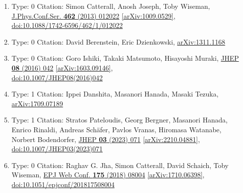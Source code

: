 \documentclass[a4paper,10pt]{article}
\begin{document}
\begin{enumerate}
\begin{enumerate}
  \item Type: 0 Citation: Simon Catterall, Anosh Joseph, Toby Wiseman, \href{https://www.doi.org/10.1088/1742-6596/462/1/012022}{J.Phys.Conf.Ser. {\bf 462} (2013) 012022}  \href{https://arxiv.org/abs/1009.0529}{[arXiv:1009.0529]},\\\href{https://www.doi.org/10.1088/1742-6596/462/1/012022}{doi:10.1088/1742-6596/462/1/012022}
  \item Type: 0 Citation: David Berenstein, Eric Dzienkowski, \href{https://arxiv.org/abs/1311.1168}{arXiv:1311.1168}
  \item Type: 0 Citation: Goro Ishiki, Takaki Matsumoto, Hisayoshi Muraki, \href{https://www.doi.org/10.1007/JHEP08(2016)042}{JHEP {\bf 08} (2016) 042}  \href{https://arxiv.org/abs/1603.09146}{[arXiv:1603.09146]},\\\href{https://www.doi.org/10.1007/JHEP08(2016)042}{doi:10.1007/JHEP08(2016)042}
  \item Type: 1 Citation: Ippei Danshita, Masanori Hanada, Masaki Tezuka, \href{https://arxiv.org/abs/1709.07189}{arXiv:1709.07189}
  \item Type: 1 Citation: Stratos Pateloudis, Georg Bergner, Masanori Hanada, Enrico Rinaldi, Andreas Schäfer, Pavlos Vranas, Hiromasa Watanabe, Norbert Bodendorfer, \href{https://www.doi.org/10.1007/JHEP03(2023)071}{JHEP {\bf 03} (2023) 071}  \href{https://arxiv.org/abs/2210.04881}{[arXiv:2210.04881]},\\\href{https://www.doi.org/10.1007/JHEP03(2023)071}{doi:10.1007/JHEP03(2023)071}
  \item Type: 0 Citation: Raghav G. Jha, Simon Catterall, David Schaich, Toby Wiseman, \href{https://www.doi.org/10.1051/epjconf/201817508004}{EPJ Web Conf. {\bf 175} (2018) 08004}  \href{https://arxiv.org/abs/1710.06398}{[arXiv:1710.06398]},\\\href{https://www.doi.org/10.1051/epjconf/201817508004}{doi:10.1051/epjconf/201817508004}

\end{enumerate}
\end{enumerate}
\end{document}
